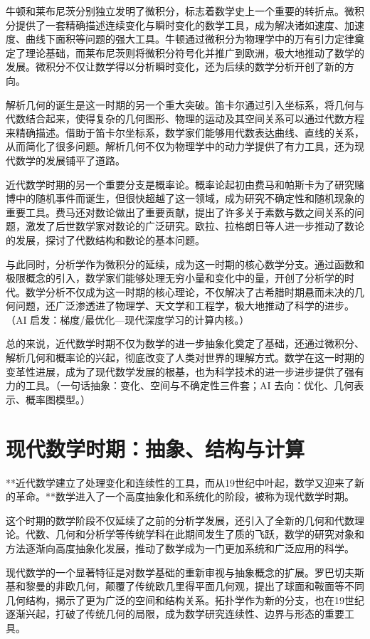 牛顿和莱布尼茨分别独立发明了微积分，标志着数学史上一个重要的转折点。微积分提供了一套精确描述连续变化与瞬时变化的数学工具，成为解决诸如速度、加速度、曲线下面积等问题的强大工具。牛顿通过微积分为物理学中的万有引力定律奠定了理论基础，而莱布尼茨则将微积分符号化并推广到欧洲，极大地推动了数学的发展。微积分不仅让数学得以分析瞬时变化，还为后续的数学分析开创了新的方向。

解析几何的诞生是这一时期的另一个重大突破。笛卡尔通过引入坐标系，将几何与代数结合起来，使得复杂的几何图形、物理的运动及其空间关系可以通过代数方程来精确描述。借助于笛卡尔坐标系，数学家们能够用代数表达曲线、直线的关系，从而简化了很多问题。解析几何不仅为物理学中的动力学提供了有力工具，还为现代数学的发展铺平了道路。

近代数学时期的另一个重要分支是概率论。概率论起初由费马和帕斯卡为了研究赌博中的随机事件而诞生，但很快超越了这一领域，成为研究不确定性和随机现象的重要工具。费马还对数论做出了重要贡献，提出了许多关于素数与数之间关系的问题，激发了后世数学家对数论的广泛研究。欧拉、拉格朗日等人进一步推动了数论的发展，探讨了代数结构和数论的基本问题。

与此同时，分析学作为微积分的延续，成为这一时期的核心数学分支。通过函数和极限概念的引入，数学家们能够处理无穷小量和变化中的量，开创了分析学的时代。数学分析不仅成为这一时期的核心理论，不仅解决了古希腊时期悬而未决的几何问题，还广泛渗透进了物理学、天文学和工程学，极大地推动了科学的进步。{（AI 启发：梯度/最优化—现代深度学习的计算内核。）}

总的来说，近代数学时期不仅为数学的进一步抽象化奠定了基础，还通过微积分、解析几何和概率论的兴起，彻底改变了人类对世界的理解方式。数学在这一时期的变革性进展，成为了现代数学发展的根基，也为科学技术的进一步进步提供了强有力的工具。{（一句话抽象：变化、空间与不确定性三件套；AI 去向：优化、几何表示、概率图模型。）}

\section{现代数学时期：抽象、结构与计算}
**近代数学建立了处理变化和连续性的工具，而从19世纪中叶起，数学又迎来了新的革命。**数学进入了一个高度抽象化和系统化的阶段，被称为现代数学时期。

这个时期的数学阶段不仅延续了之前的分析学发展，还引入了全新的几何和代数理论。代数、几何和分析学等传统学科在此期间发生了质的飞跃，数学的研究对象和方法逐渐向高度抽象化发展，推动了数学成为一门更加系统和广泛应用的科学。

现代数学的一个显著特征是对数学基础的重新审视与抽象概念的扩展。罗巴切夫斯基和黎曼的非欧几何，颠覆了传统欧几里得平面几何观，提出了球面和鞍面等不同几何结构，揭示了更为广泛的空间和结构关系。拓扑学作为新的分支，也在19世纪逐渐兴起，打破了传统几何的局限，成为数学研究连续性、边界与形态的重要工具。

